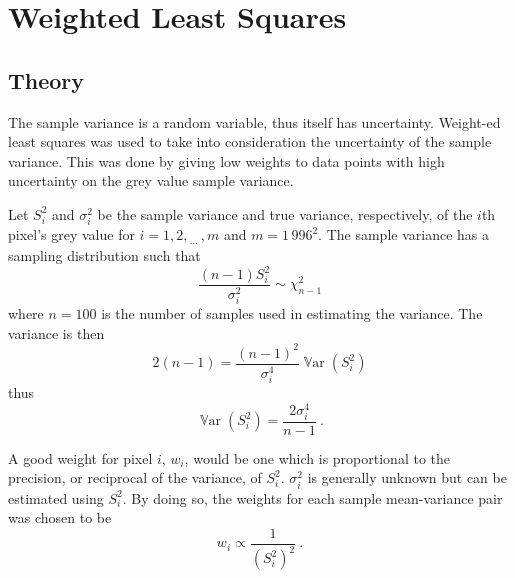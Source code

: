 \documentclass[12pt]{report}
\DeclareMathOperator{\variance}{\mathbb{V}ar}
\newcommand{\dotdotdot}{_{\phantom{.}\cdots}}
\begin{document}
\section{Weighted Least Squares}
\subsection{Theory}
The sample variance is a random variable, thus itself has uncertainty. Weight-ed least squares was used to take into consideration the uncertainty of the sample variance. This was done by giving low weights to data points with high uncertainty on the grey value sample variance.

Let $S_i^2$ and $\sigma_i^2$ be the sample variance and true variance, respectively, of the $i$th pixel's grey value for $i=1,2,\dotdotdot,m$ and $m=1\,996^2$. The sample variance has a sampling distribution such that \cite[pp.~195-198]{rice2009mathematical}
\begin{equation}
\frac{(n-1)S_i^2}{\sigma_i^2}\sim\chi_{n-1}^2
\end{equation}
where $n=100$ is the number of samples used in estimating the variance. The variance is then
\begin{equation*}
2(n-1)=\frac{(n-1)^2}{\sigma_i^4}\variance\left(S_i^2\right)
\end{equation*}
thus
\begin{equation}
\variance\left(S_i^2\right)=\frac{2\sigma_i^4}{n-1} \ .
\end{equation}

A good weight for pixel $i$, $w_i$, would be one which is proportional to the precision, or reciprocal of the variance, of $S_i^2$. $\sigma_i^2$ is generally unknown but can be estimated using $S_i^2$. By doing so, the weights for each sample mean-variance pair was chosen to be
\begin{equation}
w_i \propto \frac{1}{\left(S_i^2\right)^2} \ .
\end{equation}
\end{document}
